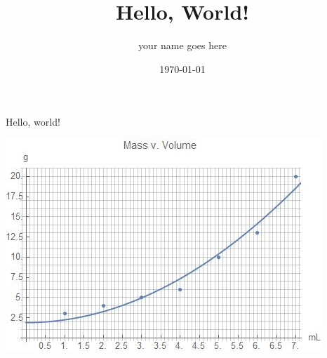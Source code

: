 \documentclass[11pt]{article}
\title{Hello, World!}
\author{your name goes here}
\date{\today}
\begin{document}
    \maketitle
    
    Hello, world!

    \includegraphics[scale=0.5]{mathematicapic}
\end{document}

